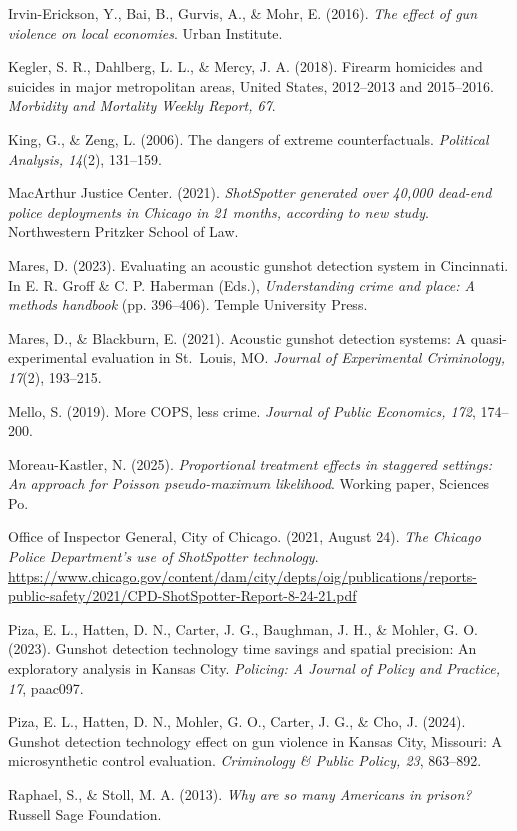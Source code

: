 \documentclass[12pt]{article}
\begin{document}
\begin{flushleft}
Irvin-Erickson, Y., Bai, B., Gurvis, A., \& Mohr, E. (2016). \emph{The effect of gun
violence on local economies}. Urban Institute.

Kegler, S. R., Dahlberg, L. L., \& Mercy, J. A. (2018). Firearm homicides and suicides in
major metropolitan areas, United States, 2012--2013 and 2015--2016. \emph{Morbidity and
Mortality Weekly Report, 67}.

King, G., \& Zeng, L. (2006). The dangers of extreme counterfactuals. \emph{Political
Analysis, 14}(2), 131--159.

MacArthur Justice Center. (2021). \emph{ShotSpotter generated over 40,000 dead-end police
deployments in Chicago in 21 months, according to new study}. Northwestern Pritzker School
of Law.

Mares, D. (2023). Evaluating an acoustic gunshot detection system in Cincinnati. In E. R.
Groff \& C. P. Haberman (Eds.), \emph{Understanding crime and place: A methods handbook}
(pp. 396--406). Temple University Press.

Mares, D., \& Blackburn, E. (2021). Acoustic gunshot detection systems: A quasi-experimental
evaluation in St.\ Louis, MO. \emph{Journal of Experimental Criminology, 17}(2), 193--215.

Mello, S. (2019). More COPS, less crime. \emph{Journal of Public Economics, 172}, 174--200.

Moreau-Kastler, N. (2025). \emph{Proportional treatment effects in staggered settings: An
approach for Poisson pseudo-maximum likelihood}. Working paper, Sciences Po.

Office of Inspector General, City of Chicago. (2021, August 24). \emph{The Chicago Police
Department's use of ShotSpotter technology}.
\url{https://www.chicago.gov/content/dam/city/depts/oig/publications/reports-public-safety/2021/CPD-ShotSpotter-Report-8-24-21.pdf}

Piza, E. L., Hatten, D. N., Carter, J. G., Baughman, J. H., \& Mohler, G. O. (2023).
Gunshot detection technology time savings and spatial precision: An exploratory analysis in
Kansas City. \emph{Policing: A Journal of Policy and Practice, 17}, paac097.

Piza, E. L., Hatten, D. N., Mohler, G. O., Carter, J. G., \& Cho, J. (2024). Gunshot
detection technology effect on gun violence in Kansas City, Missouri: A microsynthetic
control evaluation. \emph{Criminology \& Public Policy, 23}, 863--892.

Raphael, S., \& Stoll, M. A. (2013). \emph{Why are so many Americans in prison?} Russell
Sage Foundation.


\end{flushleft}
\end{document}

